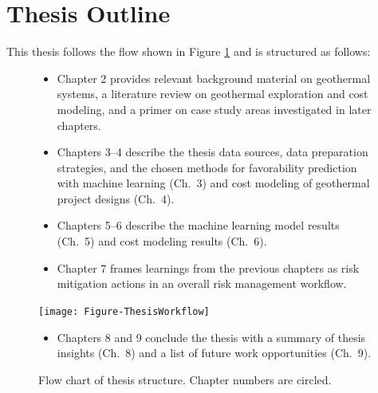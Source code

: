 \hfill\break
\section{Thesis Outline}\label{ch1:outline}
This thesis follows the flow shown in Figure \ref{fig:thesis_flow} and is structured as follows: 
\begin{figure}[!htp]
\onehalfspacing
\begin{minipage}[b]{0.5\textwidth}
\begin{itemize}
\item Chapter 2 provides relevant background material on geothermal systems, a literature review on geothermal exploration and cost modeling, and a primer on case study areas investigated in later chapters.
\item Chapters 3--4 describe the thesis data sources, data preparation strategies, and the chosen methods for favorability prediction with machine learning (Ch.\ 3) and cost modeling of geothermal project designs (Ch.\ 4).
\item Chapters 5--6 describe the machine learning model results (Ch.\ 5) and cost modeling results (Ch.\ 6).
\item Chapter 7 frames learnings from the previous chapters as risk mitigation actions in an overall risk management workflow.
\end{itemize}
\end{minipage} \hfill
\begin{minipage}[b]{0.47\textwidth}
\texttt{[image: Figure-ThesisWorkflow]}
\caption[Thesis structure flow chart]{Flow chart of thesis structure. Chapter numbers are circled.}
\label{fig:thesis_flow}
\end{minipage}
\begin{itemize}
\item Chapters 8 and 9 conclude the thesis with a summary of thesis insights (Ch.\ 8) and a list of future work opportunities (Ch.\ 9).
\end{itemize}
\end{figure}